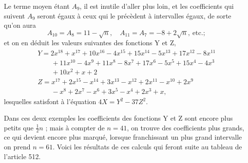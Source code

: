 \documentclass[11pt,a4paper]{article}
\begin{document}
Le terme moyen étant $A_9$, il est inutile d'aller plus loin, et les
coefficients qui suivent $A_9$ seront égaux à ceux qui le précèdent à
intervalles égaux, de sorte qu'on aura
\[
A_{10} = A_8 = 11 - \sqrt{n},\quad A_{11} = A_7 = -8 + 2\sqrt{n},\ \text{etc.};
\]
et on en déduit les valeurs suivantes des fonctions Y et Z,
\[
\begin{array}{l}
Y = 2x^{18} + x^{17} + 10x^{16} - 4x^{15} + 15x^{14} - 5x^{13} + 17x^{12} - 8x^{11} \\
\qquad + 11x^{10} - 4x^9 + 11x^8 - 8x^7 + 17x^6 - 5x^5 + 15x^4 - 4x^3 \\
\qquad + 10x^2 + x + 2 \\
Z = x^{17} + 2x^{15} - x^{14} + 3x^{13} - x^{12} + 2x^{11} - x^{10} + 2x^9 \\
\qquad - x^8 + 2x^7 - x^6 + 3x^5 - x^4 + 2x^3 + x,
\end{array}
\]
lesquelles satisfont à l'équation $4X = Y^2 - 37Z^2$.

Dans ces deux exemples les coefficients des fonctions Y et Z sont encore
plus petits que $\frac{1}{2}n$ ; mais à compter de $n = 41$, on trouve des
coefficients plus grands, ce qui devient encore plus marqué, lorsque
franchissant un plus grand intervalle on prend $n = 61$. Voici les
résultats de ces calculs qui feront suite au tableau de l'article 512.

\end{document}
